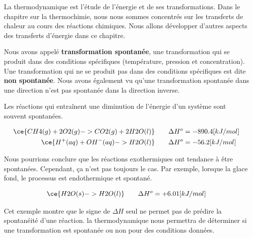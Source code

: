 \documentclass[
  11pt,
  a4paper,
  openany]{book}
\begin{document}
La thermodynamique est l'étude de l'énergie et de ses transformations. Dans le chapitre sur la thermochimie, nous nous sommes concentrés sur les transferts de chaleur au cours des réactions chimiques. Nous allons développer d'autres aspects des transferts d'énergie dans ce chapitre.

Nous avons appelé \textbf{transformation spontanée}, une transformation qui se produit dans des conditions spécifiques (température, pression et concentration). Une transformation qui ne se produit pas dans des conditions spécifiques est dite \textbf{non spontanée}. Nous avons également vu qu'une transformation spontanée dans une direction n'est pas spontanée dans la direction inverse.

Les réactions qui entraînent une diminution de l'énergie d'un système sont souvent spontanées.

\[
\begin{split}
    \ce{CH4(g) + 2O2(g) -> CO2(g) + 2H2O(l)} &\qquad \Delta H^{o} = -890.4 [kJ/mol] \\
    \ce{H^+(aq) + OH^-(aq) -> H2O(l)} &\qquad \Delta H^{o} = -56.2 [kJ/mol]
\end{split}
\]

Nous pourrions conclure que les réactions exothermiques ont tendance à être spontanées. Cependant, ça n'est pas toujours le cas. Par exemple, lorsque la glace fond, le processus est endothermique et spontané.

\[
\ce{H2O(s) -> H2O(l)} \qquad \Delta H^{o} = +6.01 [kJ/mol]
\]

Cet exemple montre que le signe de \(\Delta H\) seul ne permet pas de prédire la spontanéité d'une réaction. la thermodynamique nous permettra de déterminer si une transformation est spontanée ou non pour des conditions données.

\clearpage
\end{document}
